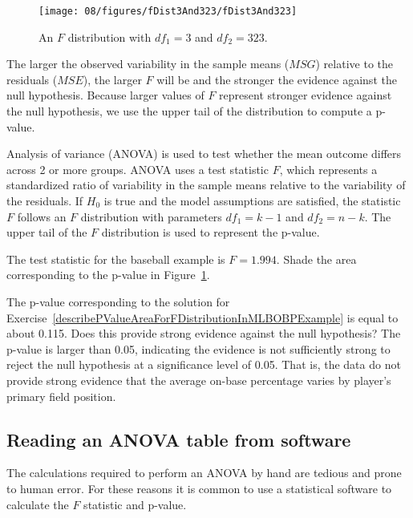 \begin{figure}[ht]
\centering
\texttt{[image: 08/figures/fDist3And323/fDist3And323]}
\caption{An $F$ distribution with $df_1=3$ and $df_2=323$.}
\label{fDist3And323}
\end{figure}

The larger the observed variability in the sample means ($MSG$) relative to the residuals ($MSE$), the larger $F$ will be and the stronger the evidence against the null hypothesis. Because larger values of $F$ represent stronger evidence against the null hypothesis, we use the upper tail of the distribution to compute a p-value.

\begin{termBox}{
Analysis of variance (ANOVA) is used to test whether the mean outcome differs across 2 or more groups. ANOVA uses a test statistic $F$, which represents a standardized ratio of variability in the sample means relative to the variability of the residuals. If $H_0$ is true and the model assumptions are satisfied, the statistic $F$ follows an $F$ distribution with parameters $df_{1}=k-1$ and $df_{2}=n-k$. The upper tail of the $F$ distribution is used to represent the p-value.}
\end{termBox}

\begin{exercise}\label{describePValueAreaForFDistributionInMLBOBPExample}
The test statistic for the baseball example is $F=1.994$. Shade the area corresponding to the p-value in Figure~\ref{fDist3And323}.
\end{exercise}

\begin{example}{The p-value corresponding to the solution for Exercise~\ref{describePValueAreaForFDistributionInMLBOBPExample} is equal to about 0.115. Does this provide strong evidence against the null hypothesis?}
The p-value is larger than 0.05, indicating the evidence is not sufficiently strong to reject the null hypothesis at a significance level of 0.05. That is, the data do not provide strong evidence that the average on-base percentage varies by player's primary field position.
\end{example}


\subsection{Reading an ANOVA table from software}

The calculations required to perform an ANOVA by hand are tedious and prone to human error. For these reasons it is common to use a statistical software to calculate the $F$ statistic and p-value.

